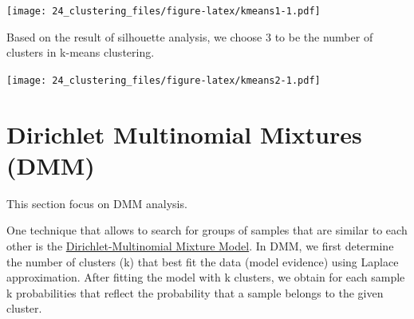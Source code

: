 \documentclass[
]{book}
\newenvironment{Shaded}{\begin{snugshade}}{\end{snugshade}}
\newcommand{\AttributeTok}[1]{\textcolor[rgb]{0.77,0.63,0.00}{#1}}
\newcommand{\CommentTok}[1]{\textcolor[rgb]{0.56,0.35,0.01}{\textit{#1}}}
\newcommand{\DecValTok}[1]{\textcolor[rgb]{0.00,0.00,0.81}{#1}}
\newcommand{\FunctionTok}[1]{\textcolor[rgb]{0.00,0.00,0.00}{#1}}
\newcommand{\NormalTok}[1]{#1}
\newcommand{\OtherTok}[1]{\textcolor[rgb]{0.56,0.35,0.01}{#1}}
\newcommand{\SpecialCharTok}[1]{\textcolor[rgb]{0.00,0.00,0.00}{#1}}
\newcommand{\StringTok}[1]{\textcolor[rgb]{0.31,0.60,0.02}{#1}}
\begin{document}
\texttt{[image: 24\_clustering\_files/figure-latex/kmeans1-1.pdf]}

Based on the result of silhouette analysis, we choose 3 to be the number of clusters
in k-means clustering.

\begin{Shaded}
\end{Shaded}

\texttt{[image: 24\_clustering\_files/figure-latex/kmeans2-1.pdf]}

\hypertarget{dirichlet-multinomial-mixtures-dmm}{%
\section{Dirichlet Multinomial Mixtures (DMM)}\label{dirichlet-multinomial-mixtures-dmm}}

This section focus on DMM analysis.

One technique that allows to search for groups of samples that are
similar to each other is the \href{https://journals.plos.org/plosone/article?id=10.1371/journal.pone.0030126}{Dirichlet-Multinomial Mixture
Model}. In
DMM, we first determine the number of clusters (k) that best fit the
data (model evidence) using Laplace approximation. After fitting the
model with k clusters, we obtain for each sample k probabilities that
reflect the probability that a sample belongs to the given cluster.
\end{document}
